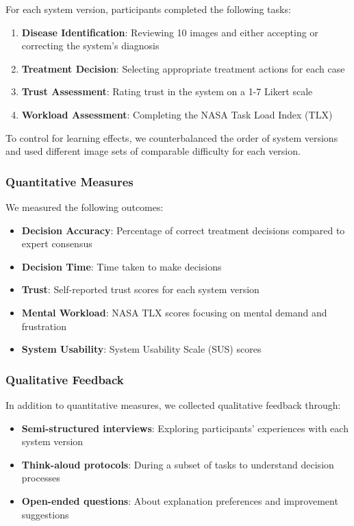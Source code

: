 For each system version, participants completed the following tasks:

\begin{enumerate}
    \item \textbf{Disease Identification}: Reviewing 10 images and either accepting or correcting the system's diagnosis
    \item \textbf{Treatment Decision}: Selecting appropriate treatment actions for each case
    \item \textbf{Trust Assessment}: Rating trust in the system on a 1-7 Likert scale
    \item \textbf{Workload Assessment}: Completing the NASA Task Load Index (TLX)
\end{enumerate}

To control for learning effects, we counterbalanced the order of system versions and used different image sets of comparable difficulty for each version.

\subsubsection{Quantitative Measures}

We measured the following outcomes:

\begin{itemize}
    \item \textbf{Decision Accuracy}: Percentage of correct treatment decisions compared to expert consensus
    \item \textbf{Decision Time}: Time taken to make decisions
    \item \textbf{Trust}: Self-reported trust scores for each system version
    \item \textbf{Mental Workload}: NASA TLX scores focusing on mental demand and frustration
    \item \textbf{System Usability}: System Usability Scale (SUS) scores
\end{itemize}

\subsubsection{Qualitative Feedback}

In addition to quantitative measures, we collected qualitative feedback through:

\begin{itemize}
    \item \textbf{Semi-structured interviews}: Exploring participants' experiences with each system version
    \item \textbf{Think-aloud protocols}: During a subset of tasks to understand decision processes
    \item \textbf{Open-ended questions}: About explanation preferences and improvement suggestions
\end{itemize}

